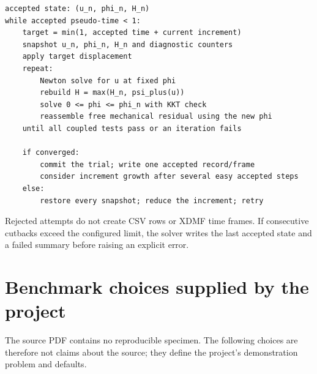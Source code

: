 \documentclass[11pt,a4paper]{article}
\begin{document}
\begin{lstlisting}[style=plaincode]
accepted state: (u_n, phi_n, H_n)
while accepted pseudo-time < 1:
    target = min(1, accepted time + current increment)
    snapshot u_n, phi_n, H_n and diagnostic counters
    apply target displacement
    repeat:
        Newton solve for u at fixed phi
        rebuild H = max(H_n, psi_plus(u))
        solve 0 <= phi <= phi_n with KKT check
        reassemble free mechanical residual using the new phi
    until all coupled tests pass or an iteration fails

    if converged:
        commit the trial; write one accepted record/frame
        consider increment growth after several easy accepted steps
    else:
        restore every snapshot; reduce the increment; retry
\end{lstlisting}

Rejected attempts do not create CSV rows or XDMF time frames. If consecutive
cutbacks exceed the configured limit, the solver writes the last accepted state
and a failed summary before raising an explicit error.

\section{Benchmark choices supplied by the project}

The source PDF contains no reproducible specimen. The following choices are
therefore not claims about the source; they define the project's demonstration
problem and defaults.
\end{document}
